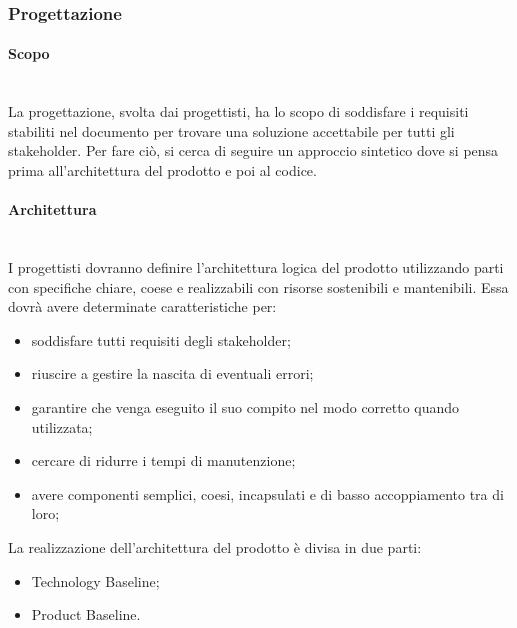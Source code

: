 \subsubsection{Progettazione}
\paragraph{Scopo}\mbox{}\\
La progettazione, svolta dai progettisti, ha lo scopo di soddisfare i requisiti stabiliti nel documento \AdR{} per trovare una soluzione accettabile per tutti gli stakeholder.
Per fare ciò, si cerca di seguire un approccio sintetico dove si pensa prima all’architettura del prodotto e poi al codice.

\paragraph{Architettura}\mbox{}\\
I progettisti dovranno definire l’architettura logica del prodotto utilizzando parti con specifiche chiare, coese e realizzabili con risorse sostenibili e mantenibili. Essa dovrà avere determinate caratteristiche per:
\begin{itemize}
	\item soddisfare tutti requisiti degli stakeholder;
	\item riuscire a gestire la nascita di eventuali errori;
	\item garantire che venga eseguito il suo compito nel modo corretto quando utilizzata;
	\item cercare di ridurre i tempi di manutenzione;
	\item avere componenti semplici, coesi, incapsulati e di basso accoppiamento tra di loro;
\end{itemize}

La realizzazione dell’architettura del prodotto è divisa in due parti:
\begin{itemize}
	\item Technology Baseline;
	\item Product Baseline.
\end{itemize}

